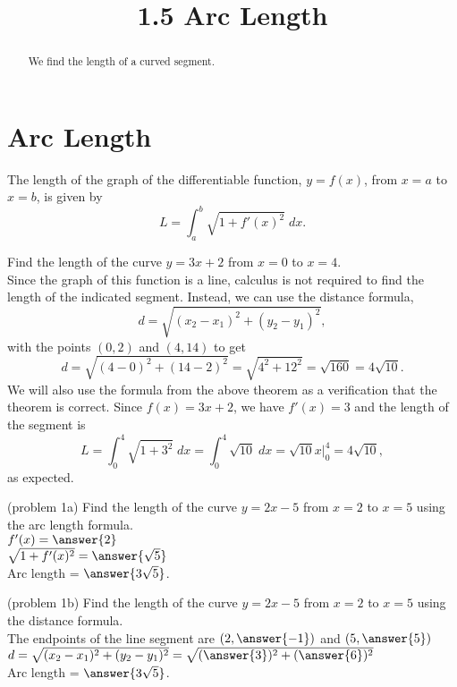 \documentclass{ximera}
\title{1.5 Arc Length}
\begin{document}
\begin{abstract}
We find the length of a curved segment.
\end{abstract}

\maketitle

\section{Arc Length}

\begin{theorem} The length of the graph of the differentiable function, $y = f(x)$, from $x = a$ to $x = b$, is given by
\[
L = \int_a^b \sqrt{1+ f'(x)^2} \; dx.
\]
\end{theorem}

\begin{example}[example 1]
Find the length of the curve $y = 3x + 2$ from $x = 0$ to $x = 4$. \\
Since the graph of this function is a line, calculus is not required to find the length of the indicated segment.
Instead, we can use the distance formula, 
\[
d = \sqrt{(x_2 - x_1)^2 + (y_2-y_1)^2},
\]
 with the points $(0,2)$ and $(4, 14)$
to get 
\[
d = \sqrt{(4-0)^2 + (14-2)^2} = \sqrt{4^2 + 12^2} = \sqrt{160} = 4\sqrt{10}.
\]
We will also use the formula from the above theorem as a verification that the theorem is correct.
Since $f(x) = 3x+2$, we have $f'(x) = 3$ and the length of the segment is
\[
L = \int_0^4 \sqrt{1 + 3^2} \;dx = \int_0^4 \sqrt{10} \; dx = \sqrt{10}x\bigg|_0^4 = 4\sqrt{10},
\]
as expected.
\end{example}



\begin{problem}(problem 1a)
Find the length of the curve $ y = 2x - 5$ from $x = 2$ to $x = 5$ using the arc length formula.\\

$f'(x) = \answer{2}$\\

$\sqrt{1+f'(x)^2} = \answer{\sqrt{5}}$\\

Arc length = $\answer{3\sqrt{5}}$.
\end{problem}



\begin{problem}(problem 1b)
Find the length of the curve $y = 2x - 5$ from $x = 2$ to $x = 5$ using the distance formula.\\

The endpoints of the line segment are $(2, \answer{-1})$ and $(5, \answer{5})$\\

$d = \sqrt{(x_2 - x_1)^2 + (y_2 - y_1)^2} = \sqrt{(\answer{3})^2 + (\answer{6})^2}$\\

Arc length = $\answer{3\sqrt{5}}$.
\end{problem}
\end{document}
